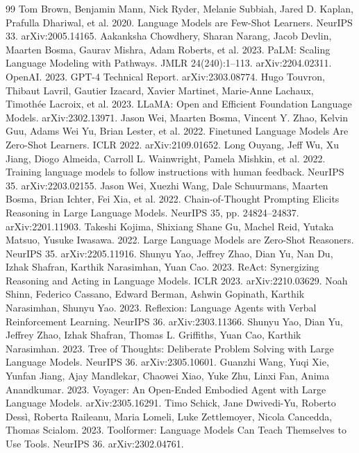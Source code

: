 \documentclass[
  sigconf,
  anonymous]{acmart}
\begin{document}
{\small\setlength{\bibsep}{1.2pt}
\begin{thebibliography}{99}
 Tom Brown, Benjamin Mann, Nick Ryder, Melanie Subbiah, Jared D. Kaplan, Prafulla Dhariwal, et al. 2020. Language Models are Few-Shot Learners. NeurIPS 33. arXiv:2005.14165.
 Aakanksha Chowdhery, Sharan Narang, Jacob Devlin, Maarten Bosma, Gaurav Mishra, Adam Roberts, et al. 2023. PaLM: Scaling Language Modeling with Pathways. JMLR 24(240):1–113. arXiv:2204.02311.
 OpenAI. 2023. GPT-4 Technical Report. arXiv:2303.08774.
 Hugo Touvron, Thibaut Lavril, Gautier Izacard, Xavier Martinet, Marie-Anne Lachaux, Timothée Lacroix, et al. 2023. LLaMA: Open and Efficient Foundation Language Models. arXiv:2302.13971.
 Jason Wei, Maarten Bosma, Vincent Y. Zhao, Kelvin Guu, Adams Wei Yu, Brian Lester, et al. 2022. Finetuned Language Models Are Zero-Shot Learners. ICLR 2022. arXiv:2109.01652.
 Long Ouyang, Jeff Wu, Xu Jiang, Diogo Almeida, Carroll L. Wainwright, Pamela Mishkin, et al. 2022. Training language models to follow instructions with human feedback. NeurIPS 35. arXiv:2203.02155.
 Jason Wei, Xuezhi Wang, Dale Schuurmans, Maarten Bosma, Brian Ichter, Fei Xia, et al. 2022. Chain-of-Thought Prompting Elicits Reasoning in Large Language Models. NeurIPS 35, pp. 24824–24837. arXiv:2201.11903.
 Takeshi Kojima, Shixiang Shane Gu, Machel Reid, Yutaka Matsuo, Yusuke Iwasawa. 2022. Large Language Models are Zero-Shot Reasoners. NeurIPS 35. arXiv:2205.11916.
 Shunyu Yao, Jeffrey Zhao, Dian Yu, Nan Du, Izhak Shafran, Karthik Narasimhan, Yuan Cao. 2023. ReAct: Synergizing Reasoning and Acting in Language Models. ICLR 2023. arXiv:2210.03629.
 Noah Shinn, Federico Cassano, Edward Berman, Ashwin Gopinath, Karthik Narasimhan, Shunyu Yao. 2023. Reflexion: Language Agents with Verbal Reinforcement Learning. NeurIPS 36. arXiv:2303.11366.
 Shunyu Yao, Dian Yu, Jeffrey Zhao, Izhak Shafran, Thomas L. Griffiths, Yuan Cao, Karthik Narasimhan. 2023. Tree of Thoughts: Deliberate Problem Solving with Large Language Models. NeurIPS 36. arXiv:2305.10601.
 Guanzhi Wang, Yuqi Xie, Yunfan Jiang, Ajay Mandlekar, Chaowei Xiao, Yuke Zhu, Linxi Fan, Anima Anandkumar. 2023. Voyager: An Open-Ended Embodied Agent with Large Language Models. arXiv:2305.16291.
 Timo Schick, Jane Dwivedi-Yu, Roberto Dessì, Roberta Raileanu, Maria Lomeli, Luke Zettlemoyer, Nicola Cancedda, Thomas Scialom. 2023. Toolformer: Language Models Can Teach Themselves to Use Tools. NeurIPS 36. arXiv:2302.04761.

\end{thebibliography}}
\end{document}

